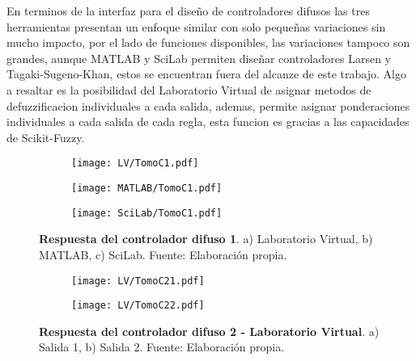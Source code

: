         En terminos de la interfaz para el diseño de controladores difusos las tres herramientas presentan un enfoque similar con solo pequeñas variaciones sin mucho impacto, por el lado de funciones disponibles, las variaciones tampoco son grandes, aunque MATLAB y SciLab permiten diseñar controladores Larsen y Tagaki-Sugeno-Khan, estos se encuentran fuera del alcanze de este trabajo. Algo a resaltar es la posibilidad del Laboratorio Virtual de asignar metodos de defuzzificacion individuales a cada salida, ademas, permite asignar ponderaciones individuales a cada salida de cada regla, esta funcion es gracias a las capacidades de Scikit-Fuzzy.

        \begin{figure}[htb]
            \centering
            \begin{subfigure}[t]{0.32\textwidth}
                \centering
                \texttt{[image: LV/TomoC1.pdf]}
                \caption{}
                \label{fig:respuestaC11}
            \end{subfigure}
            \hfill
            \begin{subfigure}[t]{0.32\textwidth}
                \centering
                \texttt{[image: MATLAB/TomoC1.pdf]}
                \caption{}
                \label{fig:respuestaC12}
            \end{subfigure}
            \hfill
            \begin{subfigure}[t]{0.32\textwidth}
                \centering
                \texttt{[image: SciLab/TomoC1.pdf]}
                \caption{}
                \label{fig:respuestaC13}
            \end{subfigure}
            
            \caption[Comparacion - Respuesta del controlador difuso 1]{\textbf{Respuesta del controlador difuso 1}. a) Laboratorio Virtual, b) MATLAB, c) SciLab. Fuente: Elaboración propia. \label{fig:respuestaC1}}
        \end{figure}

        \begin{figure}[htb]
            \centering
            \begin{subfigure}[t]{0.49\textwidth}
                \centering
                \texttt{[image: LV/TomoC21.pdf]}
                \caption{}
                \label{fig:respuestaC21LV}
            \end{subfigure}
            \hfill
            \begin{subfigure}[t]{0.49\textwidth}
                \centering
                \texttt{[image: LV/TomoC22.pdf]}
                \caption{}
                \label{fig:respuestaC22LV}
            \end{subfigure}
            
            \caption[Comparacion - Respuesta del controlador difuso 2 - Laboratorio Virtual]{\textbf{Respuesta del controlador difuso 2 - Laboratorio Virtual}. a) Salida 1, b) Salida 2. Fuente: Elaboración propia. \label{fig:respuestaC2LV}}
        \end{figure}
        
